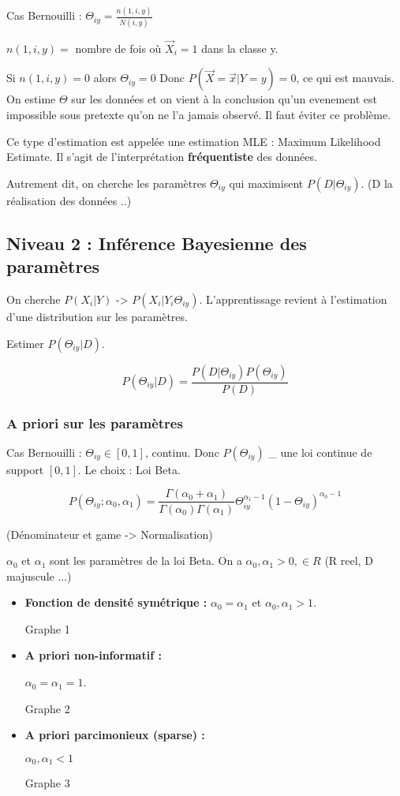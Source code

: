 \documentclass{article}
\begin{document}
Cas Bernouilli : $\Theta_{iy} = \frac{n(1, i, y)}{N(i, y)}$

$ n(1, i, y) =$ nombre de fois où $\vec{X}_i = 1$ dans la classe y.

Si $n(1, i, y) = 0$ alors $\Theta_{iy} = 0$
Donc $P(\vec{X} = \vec{x} | Y = y) = 0$, ce qui est mauvais. On estime $\Theta$ sur les données et on vient à la conclusion qu'un evenement est impossible sous pretexte qu'on ne l'a jamais observé. Il faut éviter ce problème.

Ce type d'estimation est appelée une estimation MLE : Maximum Likelihood Estimate. Il s'agit de l'interprétation \textbf{fréquentiste} des données.

Autrement dit, on cherche les paramètres $\Theta_{iy}$ qui maximisent $P(D | \Theta_{iy})$. (D la réalisation des données ..)

\subsection{Niveau 2 : Inférence Bayesienne des paramètres}

On cherche $P(X_i | Y)$ -> $P(X_i | Y_i \Theta_{iy})$. L'apprentissage revient à l'estimation d'une distribution sur les paramètres.

Estimer $ P(\Theta_{iy} | D) $.

\[ P(\Theta_{iy} | D) = \frac{P(D | \Theta_{iy})P(\Theta_{iy})}{P(D)} \]

\subsubsection{A priori sur les paramètres}

Cas Bernouilli : $\Theta_{iy} \in [0, 1]$, continu. Donc $P(\Theta_{iy})$ \_ une loi continue de support $[0, 1]$.
Le choix : Loi Beta.

\[ P(\Theta_{iy}; \alpha_0, \alpha_1) = \frac{\Gamma (\alpha_0 + \alpha_1)}{\Gamma (\alpha_0) \Gamma (\alpha_1)} \Theta_{iy}^{\alpha_1 - 1} (1 - \Theta_{iy})^{\alpha_0 - 1} \]

(Dénominateur et game -> Normalisation)

$\alpha_0$ et $\alpha_1$ sont les paramètres de la loi Beta. On a $\alpha_0, \alpha_1 > 0, \in R$ (R reel, D majuscule ...)

\begin{itemize}
\item \textbf{Fonction de densité symétrique : }
$\alpha_0 = \alpha_1$ et $\alpha_0, \alpha_1 > 1$.

Graphe 1

\item \textbf{A priori non-informatif : }

$\alpha_0 = \alpha_1 = 1$.

Graphe 2

\item \textbf{A priori parcimonieux (sparse) : }

$\alpha_0, \alpha_1 < 1$

Graphe 3

\end{itemize}
\end{document}
